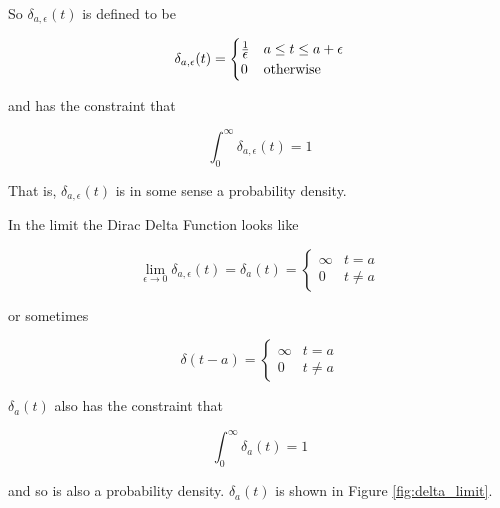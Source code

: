 \documentclass{article}
\theoremstyle{definition}
\begin{document}
\bigskip
\noindent
So $\delta_{a,\epsilon}(t)$ is defined to be

\begin{equation*}
\delta_{a,\epsilon}(t) =  
 \begin{cases} 
      \frac{1}{\mathlarger {\epsilon}} & a \leq t \leq a + \epsilon \\
      0                                               & \text{otherwise}
   \end{cases}
\label{eqn:delta}
\end{equation*}

\noindent
\bigskip
and has the constraint that


\begin{equation*}
  \int_{0}^{\infty} \delta_{a,\epsilon}(t) =  1
\end{equation*}

\bigskip
\bigskip
\noindent
\bigskip
That is, $\delta_{a,\epsilon}(t)$ is in some sense a probability density.

\bigskip
\noindent
In the limit the Dirac Delta Function looks like

\begin{equation*}
\lim_{\epsilon \to 0} \delta_{a,\epsilon}(t) =
\delta_{a}(t) =  
 \begin{cases} 
     \infty & t = a\\
      0     & t \neq a
   \end{cases}
\end{equation*}

\bigskip
\noindent
or sometimes

\begin{equation*}
\delta (t - a) =  
  \begin{cases} 
        \infty & t = a \\
        0       & t \neq a
  \end{cases}
\end{equation*}

\bigskip
\noindent
$\delta_a(t)$ also has the constraint that 


\begin{equation*}
  \int_{0}^{\infty} \delta_{a}(t) =  1
\end{equation*}

\bigskip
\noindent
and so is also a probability density. $\delta_a(t)$  is shown in Figure \ref{fig:delta_limit}.
\end{document}

